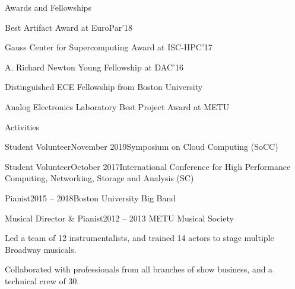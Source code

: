 \documentclass{resume}
\begin{document}
\begin{rSection}{Awards and Fellowships} \itemsep -3pt
  \item Best Artifact Award at EuroPar'18
  \item Gauss Center for Supercomputing Award at ISC-HPC'17
  \item A. Richard Newton Young Fellowship at DAC'16
  \item Distinguished ECE Fellowship from Boston University
  \item Analog Electronics Laboratory Best Project Award at METU
\end{rSection}

\begin{rSection}{Activities}
  \begin{rWorksectionNoList}{Student Volunteer}{November 2019}{Symposium on Cloud
      Computing (SoCC)}
  \end{rWorksectionNoList}

  \begin{rWorksectionNoList}{Student Volunteer}{October 2017}{International
      Conference for High Performance Computing, Networking, Storage and
      Analysis (SC)}
  \end{rWorksectionNoList}

  \begin{rWorksectionNoList}{Pianist}{2015 -- 2018}{Boston University Big Band}
  \end{rWorksectionNoList}

    \begin{rWorksection}{Musical Director \& Pianist}{2012 -- 2013}{
      METU Musical Society}
  \item Led a team of 12 instrumentalists, and trained 14 actors to stage
    multiple Broadway musicals.
  \item Collaborated with professionals from all branches of show business, and
    a technical crew of 30.
  \end{rWorksection}
\end{rSection}
\end{document}
